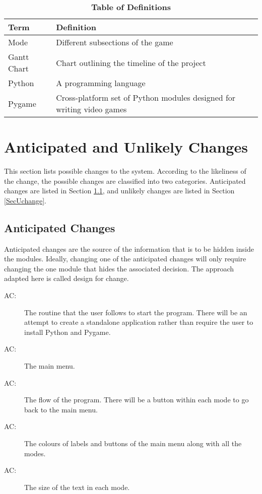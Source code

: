 \documentclass[12pt, titlepage]{article}
\newcounter{acnum}
\newcommand{\actheacnum}{AC\theacnum}
\begin{document}
\begin{table}[!htbp]
\caption{\textbf{Table of Definitions}} \label{Table}
\begin{tabularx}{\textwidth}{p{3cm}X}
\toprule
\textbf{Term} & \textbf{Definition}\\
\midrule
Mode & Different subsections of the game\\
Gantt Chart & Chart outlining the timeline of the project\\
Python & A programming language\\
Pygame & Cross-platform set of Python modules designed for writing video games\\
\bottomrule
\end{tabularx}
\end{table}	


\section{Anticipated and Unlikely Changes} \label{SecChange}

This section lists possible changes to the system. According to the likeliness
of the change, the possible changes are classified into two
categories. Anticipated changes are listed in Section \ref{SecAchange}, and
unlikely changes are listed in Section \ref{SecUchange}.

\subsection{Anticipated Changes} \label{SecAchange}

Anticipated changes are the source of the information that is to be hidden
inside the modules. Ideally, changing one of the anticipated changes will only
require changing the one module that hides the associated decision. The approach
adapted here is called design for
change.

\begin{description}
\item[ \actheacnum \label{acExecutable}:] The routine that the user follows to start the program. There will be an attempt to create a standalone application rather than require the user to install Python and Pygame.
\item[ \actheacnum \label{acInput}:] The main menu.
\item[ \actheacnum \label{acInput}:] The flow of the program. There will be a button within each mode to go back to the main menu.
\item[ \actheacnum \label{acInput}:] The colours of labels and buttons of the main menu along with all the modes.
\item[ \actheacnum \label{acInput}:] The size of the text in each mode.
\end{description}
\end{document}
